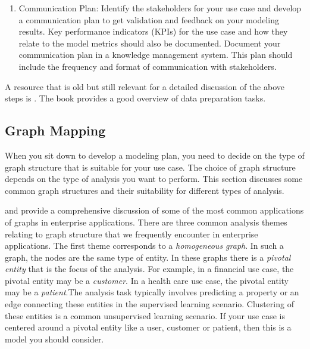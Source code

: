 \documentclass{article}
\begin{document}
\begin{enumerate}
    \item Communication Plan: Identify the stakeholders for your use case and develop a communication plan to get validation and feedback on your modeling results.  Key performance indicators (KPIs) for the use case and how they relate to the model metrics should also be documented. Document your communication plan in a knowledge management system. This plan should include the frequency and format of communication with stakeholders.
\end{enumerate}

A resource that is old but still relevant for a detailed discussion of the above steps is \cite{pyle1999data}. The book provides a good overview of data preparation tasks.


\subsection{Graph Mapping} \label{sec: graph mapping}
When you sit down to develop a modeling plan, you need to decide on the type of graph structure that is suitable for your use case. The choice of graph structure depends on the type of analysis you want to perform. This section discusses some common graph structures and their suitability for different types of analysis.

\cite{faloutsos2015ubm1} and \cite{faloutsos2015ubm2} provide a comprehensive discussion of some of the most common applications of graphs in enterprise applications. There are three common analysis themes relating to graph structure that we frequently encounter in enterprise applications. The first theme corresponds to a \emph{homogeneous graph}. In such a graph, the nodes are the same type of entity. In these graphs there is a \emph{pivotal entity} that is the focus of the analysis. For example, in a financial use case, the pivotal entity may be a \emph{customer}. In a health care use case, the pivotal entity may be a \emph{patient}.The analysis task typically involves predicting a property or an edge connecting these entities in the supervised learning scenario. Clustering of these entities is a common unsupervised learning scenario. If your use case is centered around a pivotal entity like a user, customer or patient, then this is a model you should consider.
\end{document}
